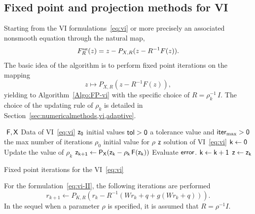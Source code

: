 {\subsection{Fixed point  and projection methods for VI}

Starting from the VI formulations~\eqref{eq:vi} or more precisely an associated nonsmooth equation through the natural map,
\begin{equation}
  \label{eq:skew-natural-NE-bis}
   F_R^\nat(z) = z - P_{X,R}(z-R^{-1} F(z)).
\end{equation}
The basic idea of the algorithm is to perform fixed point iterations on the mapping
\begin{equation}
  \label{eq:skew-fixed-point}
   z \mapsto P_{X,R}(z-R^{-1} F(z)),
\end{equation}
yielding to Algorithm~\ref{Algo:FP-vi} with the specific choice of $R=\rho_k^{-1} \, I$. The choice of the updating rule of $\rho_k$ is detailed in Section~\ref{sec:numericalmethods,vi,adaptive}.
\begin{algorithm}
  \begin{algorithmic}
    {\sf
      \STATE $ $
      \REQUIRE $\sf F,X$ Data of VI~\eqref{eq:vi}
      \REQUIRE $\sf z_0$ initial values
      \REQUIRE $\sf tol >0$ a tolerance value and $\sf iter_{\max}  >0$ the max number of iterations
      \REQUIRE $\rho_0$ initial value for $\rho$
      \ENSURE  $\sf z$ solution of VI~\eqref{eq:vi}
      \STATE   $\sf k \leftarrow 0$ 
      \STATE Update the value of $\rho_k$
      \STATE $\sf z_{k+1} \leftarrow P_{X}(z_k - \rho_k\,F(z_k))$
      \STATE Evaluate $\sf error$.
      \STATE $\sf k \leftarrow k+1$
      \ENDWHILE
      \STATE $\sf z \leftarrow z_{k}$ 
    }
  \end{algorithmic}
  \caption{Fixed point iterations for the VI~\eqref{eq:vi}}  \label{Algo:FP-vi}
\end{algorithm}
%

For the formulation~\eqref{eq:vi-II}, the following iterations are performed
\begin{equation}
  \label{eq:FP-vi-II}
       r_{k+1} \leftarrow  P_{K,R}(r_k - R^{-1}( W r_k + q +  g(W r_k + q ))).
\end{equation}
In the sequel when a parameter $\rho$ is specified, it is assumed that {$R = \rho^{-1}I$}.


}
